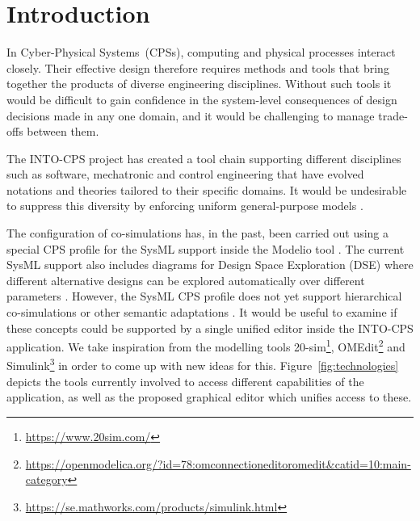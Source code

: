 \section{Introduction} \label{sec:intro}

In Cyber-Physical Systems~(CPSs), computing and physical processes interact closely. Their effective design therefore requires methods and tools that bring together the products of diverse engineering disciplines. Without such tools it would be difficult to gain confidence in the system-level consequences of design decisions made in any one domain, and it would be challenging to manage trade-offs between them. 

The INTO-CPS project has created a tool chain supporting different disciplines such as software, mechatronic and control engineering that have evolved notations and theories tailored to their specific domains. It would be undesirable to suppress this diversity by enforcing uniform general-purpose models 
\cite{Fitzgerald&15,Fitzgerald&16,Larsen&16a,Larsen&16d,Larsen&16e}.

The configuration of co-simulations has, in the past, been carried out using a special CPS profile for the SysML support inside the Modelio tool \cite{Bagnato&16}.
The current SysML support also includes diagrams for Design Space Exploration (DSE) where different alternative designs can be explored automatically over different parameters \cite{Foldager&18}. However, the SysML CPS profile does not yet support hierarchical co-simulations \cite{Thule&19} or other semantic adaptations \cite{Gomes&18a}. It would be useful to examine if these concepts could be supported by a single unified editor inside the INTO-CPS application. We take inspiration from the modelling tools 
20-sim\footnote{\url{https://www.20sim.com/}},
OMEdit\footnote{\url{https://openmodelica.org/?id=78:omconnectioneditoromedit&catid=10:main-category}} and 
Simulink\footnote{\url{https://se.mathworks.com/products/simulink.html}}
 in order to come up with new ideas for this. Figure~\ref{fig:technologies} depicts the tools currently involved to access different capabilities of the application, as well as the proposed graphical editor which unifies access to these.
 


